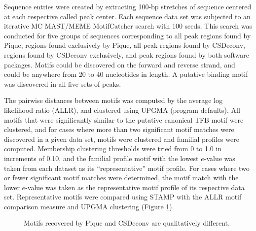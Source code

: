 Sequence entries were created by extracting 100-bp stretches of
sequence centered at each respective called peak center.  Each
sequence data set was subjected to an iterative MC MAST/MEME
MotifCatcher search \cite{Seitzer_2012} with 100 seeds. This search was conducted for
five groups of sequences corresponding to all peak regions found by
Pique, regions found exclusively by Pique, all peak regions found by
CSDeconv, regions found by CSDeconv exclusively, and peak regions
found by both software packages. Motifs could be discovered on the
forward and reverse strand, and could be anywhere from 20 to 40
nucleotides in length. A putative binding motif was discovered in all
five sets of peaks.

The pairwise distances between motifs was computed by the average log
likelihood ratio (ALLR), and clustered using UPGMA (program
defaults). All motifs that were significantly similar to the putative
canonical TFB motif were clustered, and for cases where more than two
significant motif matches were discovered in a given data set, motifs
were clustered and familial profiles were computed. Membership
clustering thresholds were tried from 0 to 1.0 in increments of 0.10,
and the familial profile motif with the lowest $e$-value was taken
from each dataset as its ``representative'' motif profile.  For cases
where two or fewer significant motif matches were determined, the
motif match with the lower $e$-value was taken as the representative
motif profile of its respective data set. Representative motifs were
compared using STAMP \cite{STAMP} with the ALLR motif comparison
measure and UPGMA clustering (Figure \ref{P_motif-tree}).

\begin{figure}
  \begin{center}
    {}
  \end{center}
  \caption{Motifs recovered by Pique and CSDeconv are qualitatively
    different.}\label{P_motif-tree}
\end{figure}

